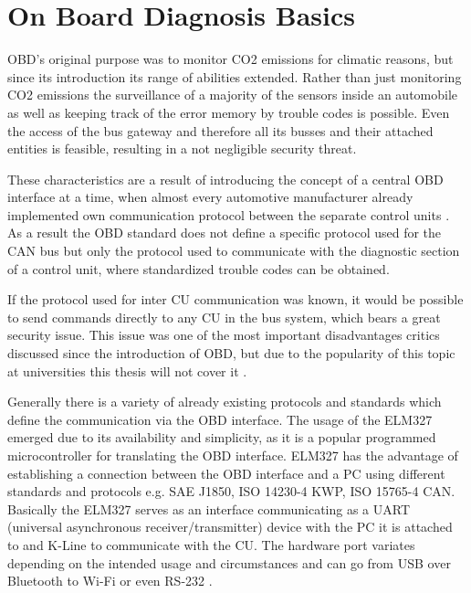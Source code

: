 

\chapter{On Board Diagnosis Basics}
\label{sec:OBDBASICS}
OBD's original purpose was to monitor CO2 emissions for climatic reasons, but since its introduction its range of abilities 
extended. Rather than just monitoring CO2 emissions the surveillance of a majority of the sensors inside an automobile as well as 
keeping track of the error memory by trouble codes is possible. Even the access of the bus gateway and therefore all its busses and 
their attached entities is feasible, resulting in a not negligible security threat. 

These characteristics are a result of introducing the concept of a central OBD interface at a time, 
when almost every automotive manufacturer already implemented own communication protocol between the separate control units \cite{SCHAFOBD1}.
As a result the OBD standard does not define a specific protocol used for the CAN bus but only the protocol used to communicate with the diagnostic 
section of a control unit, where standardized trouble codes can be obtained. 

If the protocol used for inter CU communication was known, it would be possible to send commands directly to any CU in the bus system, which bears a 
great security issue. This issue was one of the most important disadvantages critics discussed since the introduction of OBD, but due to the
popularity of this topic at universities this thesis will not cover it \cite{Koscher2010}.

Generally there is a variety of already existing protocols and standards which define the communication via the OBD interface. The usage of the ELM327 
emerged due to its availability and simplicity, as it is a popular programmed microcontroller for translating the OBD interface. ELM327 has the 
advantage of establishing a connection between the OBD interface and a PC using different standards and protocols e.g. SAE J1850, ISO 14230-4 KWP, 
ISO 15765-4 CAN. Basically the ELM327 serves as an interface communicating as a UART (universal asynchronous receiver/transmitter) device with the 
PC it is attached to and K-Line to communicate with the CU. The hardware port variates depending on the intended usage and circumstances and can go 
from USB over Bluetooth to Wi-Fi or even RS-232 \cite[pp. 46 ff.]{SCHAFOBD2}.


